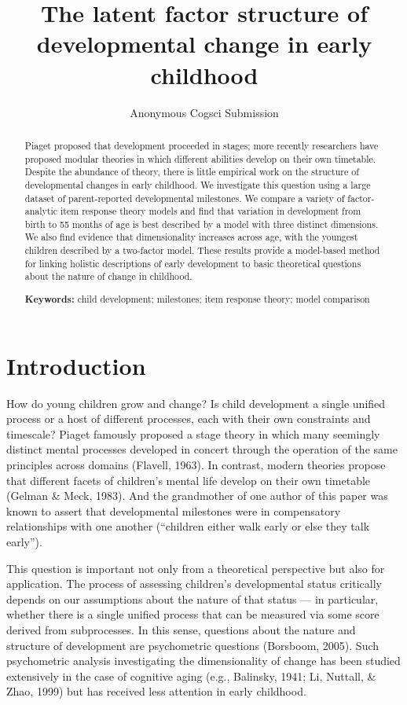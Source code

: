\documentclass[10pt, letterpaper]{article}
\title{The latent factor structure of developmental change in early childhood}
\author{Anonymous Cogsci Submission}
\begin{document}
\maketitle

\begin{abstract}
Piaget proposed that development proceeded in stages; more recently
researchers have proposed modular theories in which different abilities
develop on their own timetable. Despite the abundance of theory, there
is little empirical work on the structure of developmental changes in
early childhood. We investigate this question using a large dataset of
parent-reported developmental milestones. We compare a variety of
factor-analytic item response theory models and find that variation in
development from birth to 55 months of age is best described by a model
with three distinct dimensions. We also find evidence that
dimensionality increases across age, with the youngest children
described by a two-factor model. These results provide a model-based
method for linking holistic descriptions of early development to basic
theoretical questions about the nature of change in childhood.

\textbf{Keywords:}
child development; milestones; item response theory; model comparison
\end{abstract}

\hypertarget{introduction}{%
\section{Introduction}\label{introduction}}

How do young children grow and change? Is child development a single
unified process or a host of different processes, each with their own
constraints and timescale? Piaget famously proposed a stage theory in
which many seemingly distinct mental processes developed in concert
through the operation of the same principles across domains (Flavell,
1963). In contrast, modern theories propose that different facets of
children's mental life develop on their own timetable (Gelman \& Meck,
1983). And the grandmother of one author of this paper was known to
assert that developmental milestones were in compensatory relationships
with one another (``children either walk early or else they talk
early'').

This question is important not only from a theoretical perspective but
also for application. The process of assessing children's developmental
status critically depends on our assumptions about the nature of that
status --- in particular, whether there is a single unified process that
can be measured via some score derived from subprocesses. In this sense,
questions about the nature and structure of development are psychometric
questions (Borsboom, 2005). Such psychometric analysis investigating the
dimensionality of change has been studied extensively in the case of
cognitive aging (e.g., Balinsky, 1941; Li, Nuttall, \& Zhao, 1999) but
has received less attention in early childhood.
\end{document}

